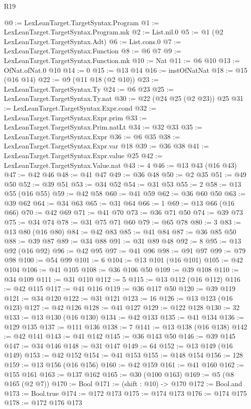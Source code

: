 \begin{lexlean}{R19}
\begin{coremodule}
@0 := LexLeanTarget.TargetSyntax.Program
@1 := LexLeanTarget.TargetSyntax.Program.mk
@2 := List.nil.{0}
@5 := @1 (@2 LexLeanTarget.TargetSyntax.Adt)
@6 := List.cons.{0}
@7 := LexLeanTarget.TargetSyntax.Function
@8 := @6 @7
@9 := LexLeanTarget.TargetSyntax.Function.mk
@10 := Nat
@11 := @6 @10
@13 := OfNat.ofNat.{0} @10
@14 := 0
@15 := @13 @14
@16 := instOfNatNat
@18 := @15 (@16 @14)
@22 := @9 (@11 @18 (@2 @10))
@23 := LexLeanTarget.TargetSyntax.Ty
@24 := @6 @23
@25 := LexLeanTarget.TargetSyntax.Ty.nat
@30 := @22 (@24 @25 (@2 @23)) @25
@31 := LexLeanTarget.TargetSyntax.Expr.cond
@32 := LexLeanTarget.TargetSyntax.Expr.prim
@33 := LexLeanTarget.TargetSyntax.Prim.natLt
@34 := @32 @33
@35 := LexLeanTarget.TargetSyntax.Expr
@36 := @6 @35
@38 := LexLeanTarget.TargetSyntax.Expr.var @18
@39 := @36 @38
@41 := LexLeanTarget.TargetSyntax.Expr.value @25
@42 := LexLeanTarget.TargetSyntax.Value.nat
@43 := 4
@46 := @13 @43 (@16 @43)
@47 := @42 @46
@48 := @41 @47
@49 := @36 @48
@50 := @2 @35
@51 := @49 @50
@52 := @39 @51
@53 := @34 @52
@54 := @31 @53
@55 := 2
@58 := @13 @55 (@16 @55)
@59 := @42 @58
@60 := @41 @59
@62 := @36 @60 @50
@63 := @39 @62
@64 := @34 @63
@65 := @31 @64
@66 := 1
@69 := @13 @66 (@16 @66)
@70 := @42 @69
@71 := @41 @70
@73 := @36 @71 @50
@74 := @39 @73
@75 := @34 @74
@78 := @31 @75 @71 @60
@79 := @65 @78
@80 := 3
@83 := @13 @80 (@16 @80)
@84 := @42 @83
@85 := @41 @84
@87 := @36 @85 @50
@88 := @39 @87
@89 := @34 @88
@91 := @31 @89 @48
@92 := 8
@95 := @13 @92 (@16 @92)
@96 := @42 @95
@97 := @41 @96
@98 := @91 @97
@99 := @79 @98
@100 := @54 @99
@101 := 6
@104 := @13 @101 (@16 @101)
@105 := @42 @104
@106 := @41 @105
@108 := @36 @106 @50
@109 := @39 @108
@110 := @34 @109
@111 := @31 @110
@112 := 5
@115 := @13 @112 (@16 @112)
@116 := @42 @115
@117 := @41 @116
@119 := @36 @117 @50
@120 := @39 @119
@121 := @34 @120
@122 := @31 @121
@123 := 16
@126 := @13 @123 (@16 @123)
@127 := @42 @126
@128 := @41 @127
@129 := @122 @128
@130 := 32
@133 := @13 @130 (@16 @130)
@134 := @42 @133
@135 := @41 @134
@136 := @129 @135
@137 := @111 @136
@138 := 7
@141 := @13 @138 (@16 @138)
@142 := @42 @141
@143 := @41 @142
@145 := @36 @143 @50
@146 := @39 @145
@147 := @34 @146
@148 := @31 @147
@149 := 64
@152 := @13 @149 (@16 @149)
@153 := @42 @152
@154 := @41 @153
@155 := @148 @154
@156 := 128
@159 := @13 @156 (@16 @156)
@160 := @42 @159
@161 := @41 @160
@162 := @155 @161
@163 := @137 @162
@165 := @30 (@100 @163)
@169 := @5 (@8 @165 (@2 @7))
@170 := Bool
@171 := (shift : @10) -> @170
@172 := Bool.and
@173 := Bool.true
@174 := @172 @173
@175 := @174 @173
@176 := @174 @175
@178 := @172 @176 @173

\end{coremodule}
\end{lexlean}
